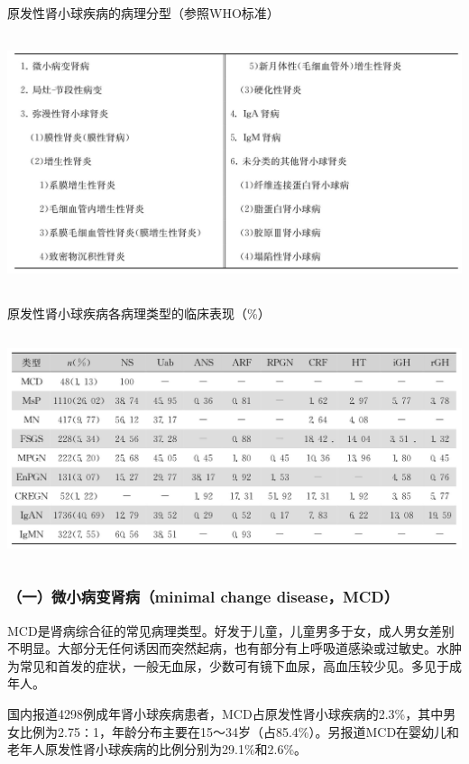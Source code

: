 \begin{table}[htbp]
\centering
\caption{原发性肾小球疾病的病理分型（参照WHO标准）}
\label{tab37-2}
\includegraphics[width=5.96875in,height=2.92708in]{./images/Image00233.jpg}
\end{table}

\begin{table}[htbp]
\centering
\caption{原发性肾小球疾病各病理类型的临床表现（\%）}
\label{tab37-3}
\includegraphics[width=5.94792in,height=2.61458in]{./images/Image00234.jpg}
\end{table}

\subsubsection{（一）微小病变肾病（minimal change disease，MCD）}

MCD是肾病综合征的常见病理类型。好发于儿童，儿童男多于女，成人男女差别不明显。大部分无任何诱因而突然起病，也有部分有上呼吸道感染或过敏史。水肿为常见和首发的症状，一般无血尿，少数可有镜下血尿，高血压较少见。多见于成年人。

国内报道4298例成年肾小球疾病患者，MCD占原发性肾小球疾病的2.3\%，其中男女比例为2.75∶1，年龄分布主要在15～34岁（占85.4\%）。另报道MCD在婴幼儿和老年人原发性肾小球疾病的比例分别为29.1\%和2.6\%。

